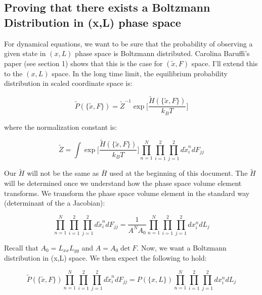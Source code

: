 \documentclass[12pt]{article}
\begin{document}
\subsection{Proving that there exists a Boltzmann Distribution in (x,L) phase space}
For dynamical equations, we want to be sure that the probability of observing a given state in $({x}, {L})$ phase space is Boltzmann distributed. Carolina Baruffi's paper (see section 1) shows that this is the case for $({\tilde{x}}, {F})$ space. I'll extend this to the $({x}, {L})$ space. In the long time limit, the equilibrium probability distribution in scaled coordinate space is:
\begin{center}
\begin{equation}
\tilde{P}(\{\tilde{x}, F\}) = \tilde{Z}^{-1} \exp\bigg[\frac{\tilde{H}(\{\tilde{x}, F\})}{k_B T}\bigg]
\end{equation}
\end{center}
where the normalization constant is:
\begin{center}
\begin{equation}
\tilde{Z} = \int \exp\bigg[\frac{\tilde{H}(\{\tilde{x}, F\})}{k_B T}\bigg]\prod\limits_{n=1}^N \prod\limits_{i=1}^{2} \prod\limits_{j=1}^{2} d\tilde{x}_i^n dF_{jj}
\end{equation}
\end{center}
Our $\tilde{H}$ will not be the same as $\bar{H}$ used at the beginning of this document. The $\tilde{H}$ will be determined once we understand how the phase space volume element transforms. We transform the phase space volume element in the standard way (determinant of the a Jacobian):
\begin{center}
\begin{equation}
\label{eqn: phasespacetransform}
\prod\limits_{n=1}^N \prod\limits_{i=1}^{2} \prod\limits_{j=1}^{2} d\tilde{x}_i^n dF_{jj} = \frac{1}{A^N A_0}\prod\limits_{n=1}^N \prod\limits_{i=1}^{2} \prod\limits_{j=1}^{2} dx_i^n dL_j 
\end{equation}
\end{center}
Recall that $A_0 = L_{xx} L_{yy}$ and $A = A_0 \det F$. Now, we want a Boltzmann distribution in (x,L) space. We then expect the following to hold:
\begin{center}
\begin{equation}
\label{eqn: integrand}
\tilde{P}(\{\tilde{x}, F\}) \prod\limits_{n=1}^N \prod\limits_{i=1}^{2} \prod\limits_{j=1}^{2} d\tilde{x}_i^n dF_{jj} =  P(\{x,L\}) \prod\limits_{n=1}^N \prod\limits_{i=1}^{2} \prod\limits_{j=1}^{2} dx_i^n dL_j
\end{equation}
\end{center}
\end{document}
